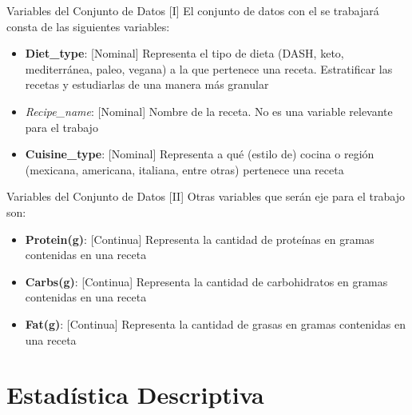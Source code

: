 \documentclass{beamer}
\begin{document}
    \begin{frame}{Variables del Conjunto de Datos [I]}
        El conjunto de datos con el se trabajará consta de 
        las siguientes variables:
        \begin{itemize}
            \item<2->\textbf{Diet\_type}: [Nominal] Representa 
            el tipo de dieta (DASH, keto, mediterránea, paleo, vegana) 
            a la que pertenece una receta. Estratificar las recetas 
            y estudiarlas de una manera más granular
            \item<3->\emph{Recipe\_name}: [Nominal] Nombre de 
            la receta. No es una variable relevante para el trabajo
            \item<4->\textbf{Cuisine\_type}: [Nominal] Representa 
            a qué (estilo de) cocina o región (mexicana, americana, 
            italiana, entre otras) pertenece una receta
        \end{itemize}
    \end{frame}

    \begin{frame}{Variables del Conjunto de Datos [II]}
        Otras variables que serán eje para el trabajo son:
        \begin{itemize}
            \item<1->\textbf{Protein(g)}: [Continua] Representa la 
            cantidad de proteínas en gramas contenidas en una receta
            \item<2->\textbf{Carbs(g)}: [Continua] Representa la 
            cantidad de carbohidratos en gramas contenidas en una receta
            \item<3->\textbf{Fat(g)}: [Continua] Representa la 
            cantidad de grasas en gramas contenidas en una receta
        \end{itemize}
    \end{frame}

    \section{Estadística Descriptiva}
\end{document}
